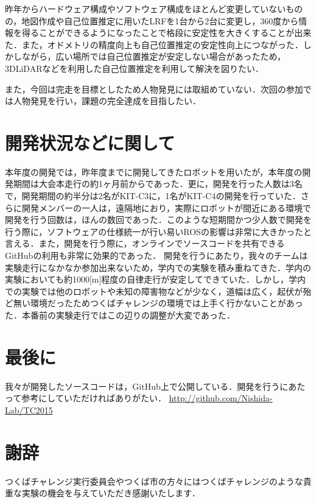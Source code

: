 \documentclass[10pt,a4paper]{jarticle}
\begin{document}
昨年からハードウェア構成やソフトウェア構成をほとんど変更していないものの，地図作成や自己位置推定に用いたLRFを1台から2台に変更し，360度から情報を得ることができるようになったことで格段に安定性を大きくすることが出来た．また，オドメトリの精度向上も自己位置推定の安定性向上につながった．しかしながら，広い場所では自己位置推定が安定しない場合があったため，3DLiDARなどを利用した自己位置推定を利用して解決を図りたい．

また，今回は完走を目標としたため人物発見には取組めていない．次回の参加では人物発見を行い，課題の完全達成を目指したい．


\section{開発状況などに関して}
本年度の開発では，昨年度までに開発してきたロボットを用いたが，本年度の開発期間は大会本走行の約1ヶ月前からであった．更に，開発を行った人数は3名で，開発期間の約半分は2名がKIT-C3に，1名がKIT-C4の開発を行っていた．さらに開発メンバーの一人は，遠隔地におり，実際にロボットが間近にある環境で開発を行う回数は，ほんの数回であった．このような短期間かつ少人数で開発を行う際に，ソフトウェアの仕様統一が行い易いROSの影響は非常に大きかったと言える．また，開発を行う際に，オンラインでソースコードを共有できるGitHubの利用も非常に効果的であった．
開発を行うにあたり，我々のチームは実験走行になかなか参加出来ないため，学内での実験を積み重ねてきた．学内の実験においても約1000[m]程度の自律走行が安定してできていた．しかし，学内での実験では他のロボットや未知の障害物などが少なく，道幅は広く，起伏が殆ど無い環境だったためつくばチャレンジの環境では上手く行かないことがあった．本番前の実験走行ではこの辺りの調整が大変であった．

\section{最後に}
我々が開発したソースコードは，GitHub上で公開している．開発を行うにあたって参考にしていただければありがたい．
\url{http://github.com/Nishida-Lab/TC2015}

\section*{謝辞}
つくばチャレンジ実行委員会やつくば市の方々にはつくばチャレンジのような貴重な実験の機会を与えていただき感謝いたします．



 

\end{document}

